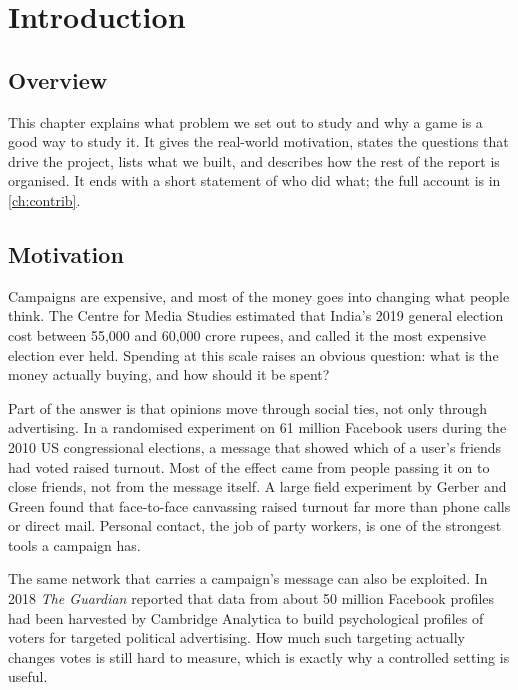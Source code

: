 \documentclass[11pt,a4paper,oneside]{report}
\newcommand{\overviewsection}{\section{Overview}}
\begin{document}
\chapter{Introduction}\label{ch:intro}

\overviewsection

This chapter explains what problem we set out to study and why a game is a good way to study it. It gives
the real-world motivation, states the questions that drive the project, lists what we built, and describes
how the rest of the report is organised. It ends with a short statement of who did what; the full account
is in \cref{ch:contrib}.

\section{Motivation}

Campaigns are expensive, and most of the money goes into changing what people think. The Centre for Media
Studies estimated that India's 2019 general election cost between 55,000 and 60,000 crore rupees, and
called it the most expensive election ever held. Spending at this scale
raises an obvious question: what is the money actually buying, and how should it be spent?

Part of the answer is that opinions move through social ties, not only through advertising. In a
randomised experiment on 61 million Facebook users during the 2010 US congressional elections, a message
that showed which of a user's friends had voted raised turnout. Most of the effect came from people
passing it on to close friends, not from the message itself. A large field experiment by
Gerber and Green found that face-to-face canvassing raised turnout far more than phone calls or direct
mail. Personal contact, the job of party workers, is one of the strongest tools a
campaign has.

The same network that carries a campaign's message can also be exploited. In 2018 \emph{The Guardian}
reported that data from about 50 million Facebook profiles had been harvested by Cambridge Analytica to
build psychological profiles of voters for targeted political advertising. How much
such targeting actually changes votes is still hard to measure, which is exactly why a controlled setting
is useful.
\end{document}
